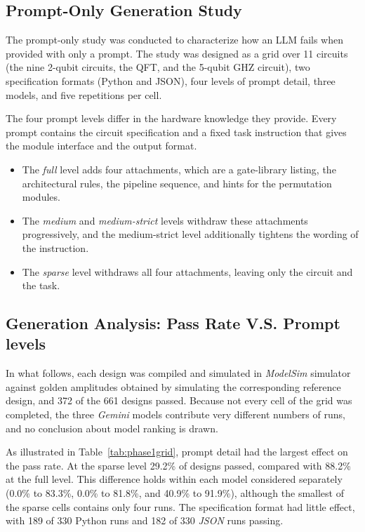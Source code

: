 \documentclass[conference]{IEEEtran}
\begin{document}
\subsection{Prompt-Only Generation Study}
\label{subsec:prior}

The prompt-only study was conducted to characterize how an LLM fails when provided with only a prompt. The study was designed as a grid
over 11 circuits (the nine 2-qubit circuits, the QFT, and the 5-qubit GHZ circuit), two specification formats (Python and JSON), four levels of prompt detail, three models, and five repetitions per cell.

The four prompt levels differ in the hardware knowledge they provide. Every
prompt contains the circuit specification and a fixed task instruction that
gives the module interface and the output format. 

\begin{itemize}
    \item The \emph{full} level
adds four attachments, which are a gate-library listing, the architectural
rules, the pipeline sequence, and hints for the permutation modules. 
\item The
\emph{medium} and \emph{medium-strict} levels withdraw these attachments
progressively, and the medium-strict level additionally tightens the
wording of the instruction. 
\item The \emph{sparse} level withdraws all four
attachments, leaving only the circuit and the task. 
\end{itemize}

\subsection{Generation Analysis: Pass Rate V.S. Prompt levels}
In what follows, each design was compiled and simulated in \textit{ModelSim} simulator against golden amplitudes obtained by
simulating the corresponding reference design, and 372 of the 661 designs
passed. Because not every cell of the grid was completed, the three \textit{Gemini} models
contribute very different numbers of runs, and no conclusion about model
ranking is drawn.

As illustrated in Table~\ref{tab:phase1grid}, prompt detail had the largest effect on the pass rate. At the sparse level 29.2\% of designs passed, compared with 88.2\% at the full level. This difference holds within each model considered separately (0.0\% to 83.3\%, 0.0\% to 81.8\%, and 40.9\% to 91.9\%),
although the smallest of the sparse cells contains only four runs. The
specification format had little effect, with 189 of 330 Python runs and 182 of 330 \textit{JSON} runs passing.
\end{document}
